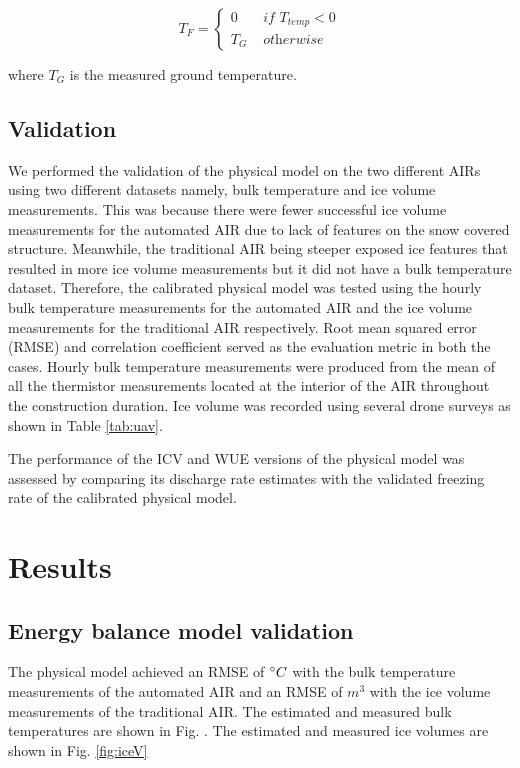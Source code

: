 \documentclass[tc, manuscript]{copernicus}
\begin{document}
\begin{equation}
	T_{F} = \left\{ \begin{array}{ll}
		0 & \textit{ if } T_{temp} < 0 \\
		T_{G} & \textit{ otherwise}
	\end{array} \right.
\end{equation}

where $T_{G}$ is the measured ground temperature.

\subsection{Validation}
We performed the validation of the physical model on the two different AIRs using two different datasets namely,
bulk temperature and ice volume measurements. This was because there were fewer successful ice volume
measurements for the automated AIR due to lack of features on the snow covered structure. Meanwhile, the traditional
AIR being steeper exposed ice features that resulted in more ice volume measurements but it did not have a bulk
temperature dataset. Therefore, the calibrated physical model was tested using the hourly bulk temperature
measurements for the automated AIR and the ice volume measurements for the traditional AIR respectively. Root
mean squared error (RMSE) and correlation coefficient served as the evaluation metric in both the cases. Hourly
bulk temperature measurements were produced from the mean of all the thermistor measurements located at the
interior of the AIR throughout the construction duration. Ice volume was recorded using several drone surveys as
shown in Table \ref{tab:uav}.

The performance of the ICV and WUE versions of the physical model was assessed by comparing its discharge rate
estimates with the validated freezing rate of the calibrated physical model.

\section{Results}

\subsection{Energy balance model validation}
The physical model achieved an RMSE of $^{\circ} C$ with the bulk temperature measurements of the automated AIR
and an RMSE of $m^3$ with the ice volume measurements of the traditional AIR. The estimated and measured bulk
temperatures are shown in Fig. . The estimated and measured ice volumes are shown in Fig. \ref{fig:iceV}
 
\end{document}
